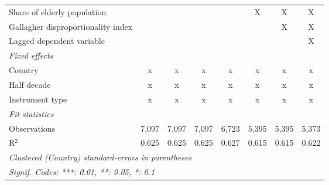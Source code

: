 \begin{tabular}{lccccccc}
   Share of elderly population                                                                     &             &             &              &               & X       & X       & X\\  
   Gallagher disproportionality index                                                              &             &             &              &               &         & X       & X\\  
   Lagged dependent variable                                                                       &             &             &              &               &         &         & X\\  
   \emph{Fixed effects}\\
   Country                                                                                         & x           & x           & x            & x             & x       & x       & x\\  
   Half decade                                                                                     & x           & x           & x            & x             & x       & x       & x\\  
   Instrument type                                                                                 & x           & x           & x            & x             & x       & x       & x\\  
   \midrule \emph{Fit statistics}\\
   Observations                                                                                    & 7,097       & 7,097       & 7,097        & 6,723         & 5,395   & 5,395   & 5,373\\  
   R$^2$                                                                                           & 0.625       & 0.625       & 0.625        & 0.627         & 0.615   & 0.615   & 0.622\\  
   \midrule
   \multicolumn{8}{l}{\emph{Clustered (Country) standard-errors in parentheses}}\\
   \multicolumn{8}{l}{\emph{Signif. Codes: ***: 0.01, **: 0.05, *: 0.1}}\\
\end{tabular}
\par\endgroup


